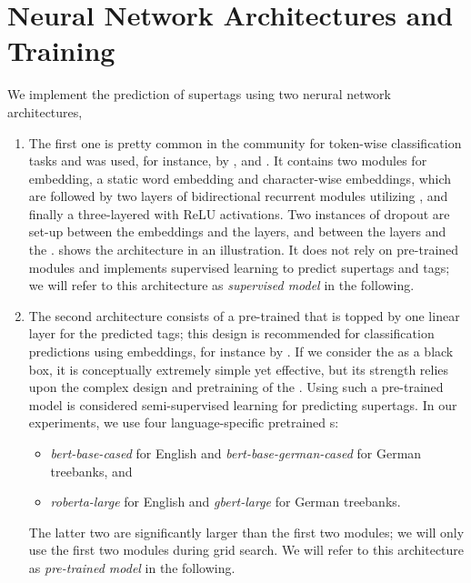 \documentclass[../../document.tex]{subfiles}
\begin{document}
    \section{Neural Network Architectures and Training}\label{sec:models}
    We implement the prediction of supertags using two nerural network architectures, 
    \begin{enumerate}
        \item
            The first one is pretty common in the  community for token-wise classification tasks and was used, for instance, by \citet{vaswani2016supertagging}, \citet{StaSte20} and \citet{Cor20}.
            It contains two modules for embedding, a static word embedding and character-wise embeddings, which are followed by two layers of bidirectional recurrent modules utilizing , and finally a three-layered  with ReLU activations.
            Two instances of dropout are set-up between the embeddings and the  layers, and between the  layers and the .
             shows the architecture in an illustration.
            It does not rely on pre-trained modules and implements supervised learning to predict supertags and  tags; we will refer to this architecture as \emph{supervised model} in the following.
        \item
            The second architecture consists of a pre-trained  that is topped by one linear layer for the predicted tags; this design is recommended for classification predictions using  embeddings, for instance by \citet{Devlin2019}.
            If we consider the  as a black box, it is conceptually extremely simple yet effective, but its strength relies upon the complex design and pretraining of the .
            Using such a pre-trained model is considered semi-supervised learning for predicting supertags.
            In our experiments, we use four language-specific pretrained s:
            \begin{itemize}
                \item \emph{bert-base-cased} for English and \emph{bert-base-german-cased} \citep{Devlin2019} for German treebanks, and
                \item \emph{roberta-large} \citep{roberta} for English and \emph{gbert-large} \citep{Cha20} for German treebanks.
            \end{itemize}
            The latter two are significantly larger than the first two modules; we will only use the first two modules during grid search.
            We will refer to this architecture as \emph{pre-trained model} in the following.
    \end{enumerate}
\end{document}
